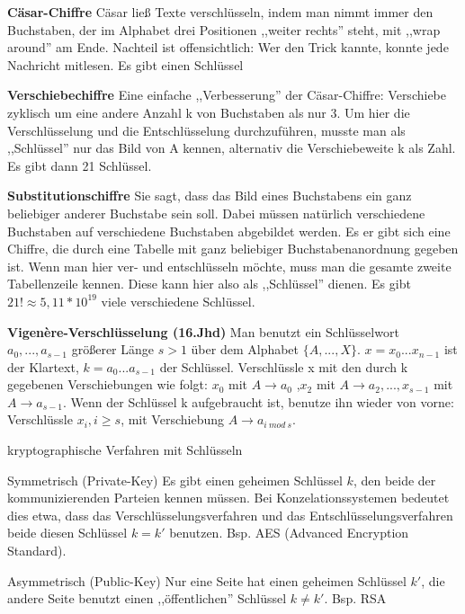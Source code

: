 \documentclass[a4paper]{article}
\renewcommand{\note}[2]{\begin{noteBox} \textbf{#1} #2 \end{noteBox}}
\begin{document}
\begin{multicols}{3}
    \note{Cäsar-Chiffre}{
        Cäsar ließ Texte verschlüsseln, indem man nimmt immer den Buchstaben, der im Alphabet drei Positionen ,,weiter rechts'' steht, mit ,,wrap around'' am Ende. Nachteil ist offensichtlich: Wer den Trick kannte, konnte jede Nachricht mitlesen. Es gibt einen Schlüssel
    }

    \note{Verschiebechiffre}{
        Eine einfache ,,Verbesserung'' der Cäsar-Chiffre: Verschiebe zyklisch um eine andere Anzahl k von Buchstaben als nur 3. Um hier die Verschlüsselung und die Entschlüsselung durchzuführen, musste man als ,,Schlüssel'' nur das Bild von A kennen, alternativ die Verschiebeweite k als Zahl. Es gibt dann 21 Schlüssel.
    }

    \note{Substitutionschiffre}{
        Sie sagt, dass das Bild eines Buchstabens ein ganz beliebiger anderer Buchstabe sein soll. Dabei müssen natürlich verschiedene Buchstaben auf verschiedene Buchstaben abgebildet werden. Es er gibt sich eine Chiffre, die durch eine Tabelle mit ganz beliebiger Buchstabenanordnung gegeben ist.
        Wenn man hier ver- und entschlüsseln möchte, muss man die gesamte zweite Tabellenzeile kennen. Diese kann hier also als ,,Schlüssel'' dienen. Es gibt $21!\approx 5,11* 10^{19}$ viele verschiedene Schlüssel.
    }

    \note{Vigenère-Verschlüsselung (16.Jhd)}{
    Man benutzt ein Schlüsselwort $a_0,...,a_{s-1}$ größerer Länge $s > 1$ über dem Alphabet $\{A,...,X\}$. $x=x_0...x_{n-1}$ ist der Klartext, $k=a_0 ...a_{s-1}$ der Schlüssel. Verschlüssle x mit den durch k gegebenen Verschiebungen wie folgt: $x_0$ mit $A \rightarrow a_0$ ,$x_2$ mit $A \rightarrow a_2,... ,x_{s-1}$ mit $A\rightarrow a_{s-1}$. Wenn der Schlüssel k aufgebraucht ist, benutze ihn wieder von vorne: Verschlüssle $x_i,i\geq s$, mit Verschiebung $A \rightarrow a_{i\ mod\ s}$.
    }

    kryptographische Verfahren mit Schlüsseln
    \begin{description*}
        \item[Symmetrisch (Private-Key)] Es gibt einen geheimen Schlüssel $k$, den beide der kommunizierenden Parteien kennen müssen. Bei Konzelationssystemen bedeutet dies etwa, dass das Verschlüsselungsverfahren und das Entschlüsselungsverfahren beide diesen Schlüssel $k=k'$ benutzen. Bsp. AES (Advanced Encryption Standard).
        \item[Asymmetrisch (Public-Key)] Nur eine Seite hat einen geheimen Schlüssel $k'$, die andere Seite benutzt einen ,,öffentlichen'' Schlüssel $k\not =k'$. Bsp. RSA
    \end{description*}


\end{multicols}
\end{document}
